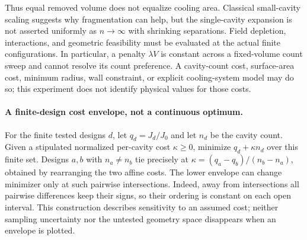 Thus equal removed volume does not equalize cooling area. Classical
small-cavity scaling suggests why fragmentation can help, but the
single-cavity expansion is not asserted uniformly as $n\to\infty$ with
shrinking separations. Field depletion, interactions, and geometric feasibility
must be evaluated at the actual finite configurations. In particular, a
penalty $\lambda V$ is constant across a fixed-volume count sweep and cannot
resolve its count preference. A cavity-count cost, surface-area cost,
minimum radius, wall constraint, or explicit cooling-system model may do so;
this experiment does not identify physical values for those costs.

\paragraph{A finite-design cost envelope, not a continuous optimum.}
For the finite tested designs $d$, let $q_d=J_d/J_0$ and let $n_d$ be the
cavity count. Given a stipulated normalized per-cavity cost $\kappa\ge0$,
minimize $q_d+\kappa n_d$ over this finite set. Designs $a,b$ with
$n_a\ne n_b$ tie precisely at
$\kappa=(q_a-q_b)/(n_b-n_a)$, obtained by rearranging the two affine costs.
The lower envelope can change minimizer only at such pairwise intersections.
Indeed, away from intersections all pairwise differences keep their signs,
so their ordering is constant on each open interval. This construction
describes sensitivity to an assumed cost; neither sampling uncertainty nor
the untested geometry space disappears when an envelope is plotted.
